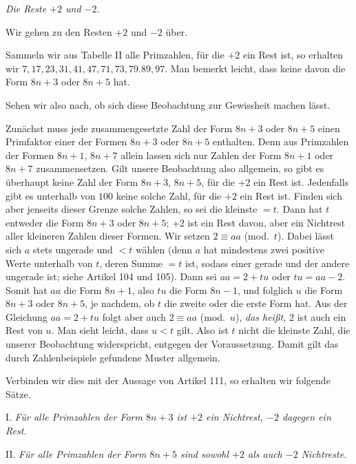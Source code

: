 \begin{center}\emph{Die Reste $+2$ und $-2$.}\end{center}

Wir gehen zu den Resten $+2$ und $-2$ über.

Sammeln wir aus Tabelle II alle Primzahlen, für die $+2$ ein Rest ist, so erhalten wir $7,17,23,31,41,47,71,73,79.89,97$. Man bemerkt leicht, dass keine davon die Form $8n+3$ oder $8n+5$ hat.

Sehen wir also nach, ob sich diese Beobachtung zur Gewissheit machen lässt.

Zunächst muss jede zusammengesetzte Zahl der Form $8n+3$ oder $8n+5$ einen Primfaktor einer der Formen $8n+3$ oder $8n+5$ enthalten. Denn aus Primzahlen der Formen $8n+1$, $8n+7$ allein lassen sich nur Zahlen der Form $8n+1$ oder $8n+7$ zusammensetzen. Gilt unsere Beobachtung also allgemein, so gibt es überhaupt keine Zahl der Form $8n+3$, $8n+5$, für die $+2$ ein Rest ist. Jedenfalls gibt es unterhalb von $100$ keine solche Zahl, für die $+2$ ein Rest ist. Finden sich aber jenseits dieser Grenze solche Zahlen, so sei die kleinste $=t$. Dann hat $t$ entweder die Form $8n+3$ oder $8n+5$; $+2$ ist ein Rest davon, aber ein Nichtrest aller kleineren Zahlen dieser Formen. Wir setzen $2\equiv aa$ (mod.~$t$). Dabei lässt sich $a$ stets ungerade und $<t$ wählen (denn $a$ hat mindestens zwei positive Werte unterhalb von $t$, deren Summe $=t$ ist, sodass einer gerade und der andere ungerade ist; siehe Artikel 104 und 105). Dann sei $aa=2+tu$ oder $tu=aa-2$. Somit hat $aa$ die Form $8n+1$, also $tu$ die Form $8n-1$, und folglich $u$ die Form $8n+3$ oder $8n+5$, je nachdem, ob $t$ die zweite oder die erste Form hat. Aus der Gleichung $aa=2+tu$ folgt aber auch $2\equiv aa$ (mod.~$u$), \emph{das heißt,} $2$ ist auch ein Rest von $u$. Man sieht leicht, dass $u<t$ gilt. Also ist $t$ nicht die kleinste Zahl, die unserer Beobachtung widerspricht, entgegen der Voraussetzung. Damit gilt das durch Zahlenbeispiele gefundene Muster allgemein.

Verbinden wir dies mit der Aussage von Artikel 111, so erhalten wir folgende Sätze.

I. \emph{Für alle Primzahlen der Form $8n+3$ ist $+2$ ein Nichtrest, $-2$ dagegen ein Rest.}

II. \emph{Für alle Primzahlen der Form $8n+5$ sind sowohl $+2$ als auch $-2$ Nichtreste.}

